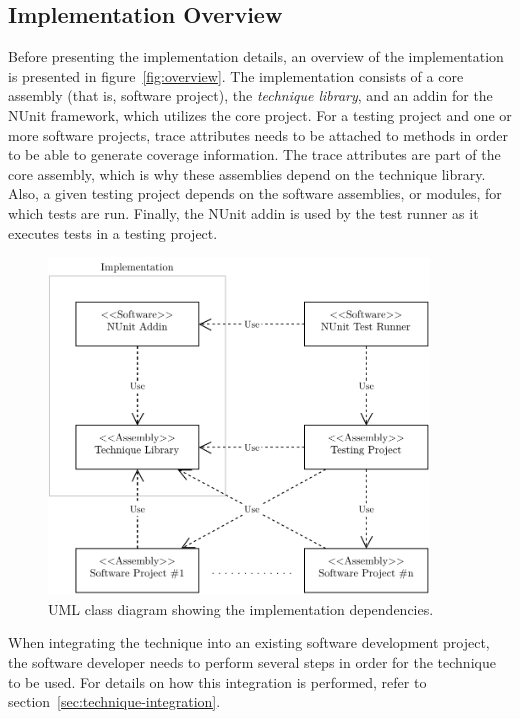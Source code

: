 \documentclass[a4paper,english,12pt]{report}
\begin{document}
\subsection{Implementation Overview}\label{sec:implementation-overview}
Before presenting the implementation details, an overview of the implementation is presented in figure~\vref{fig:overview}. The implementation consists of a core assembly (that is, software project), the \textit{technique library}, and an addin for the NUnit framework, which utilizes the core project. For a testing project and one or more software projects, trace attributes needs to be attached to methods in order to be able to generate coverage information. The trace attributes are part of the core assembly, which is why these assemblies depend on the technique library. Also, a given testing project depends on the software assemblies, or modules, for which tests are run. Finally, the NUnit addin is used by the test runner as it executes tests in a testing project.

\begin{figure}[htb]
  \centering
  \includegraphics[width=0.9\textwidth]{includes/figures/overview}
  \caption{UML class diagram showing the implementation dependencies.}
  \label{fig:overview}
\end{figure}

When integrating the technique into an existing software development project, the software developer needs to perform several steps in order for the technique to be used. For details on how this integration is performed, refer to section~\vref{sec:technique-integration}.
\end{document}
